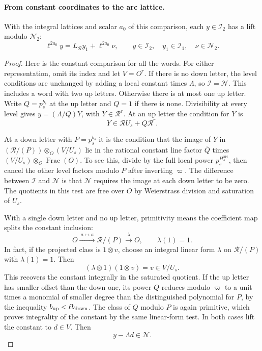 \paragraph{From constant coordinates to the arc lattice.}
\begin{lemma}\label{lem:wach-constant-lift}
With the integral lattices and scalar \(a_0\) of this comparison,
each \(y\in\mathcal I_2\) has a lift modulo \(\mathcal N_2\):
\begin{equation}\label{eq:wach-const-coord-lift}
 \ell^{2a_0}y=L_{\mathcal R}y_1+\ell^{2a_0}\nu,\qquad
 y\in\mathcal I_2,\quad y_1\in\mathcal I_1,\quad
 \nu\in\mathcal N_2 .
\end{equation}
\end{lemma}
\begin{proof}
Here is the constant comparison for all the words. For either
representation, omit its index and let \(V=O^r\). If there is
no down letter, the level conditions are unchanged by adding a
local constant times \(\Lambda\), so \(\mathcal I=\mathcal N\).
This includes a word with two up letters. Otherwise there is at
most one up letter. Write \(Q=p_s^{b_s}\) at the up letter and
\(Q=1\) if there is none. Divisibility at every level gives
\(y=(\Lambda/Q)Y\), with \(Y\in\mathcal R^r\).
At an up letter the condition for \(Y\) is
\[
             Y\in\mathcal R U_s+Q\mathcal R^r .
\]

At a down letter with \(P=p_s^{b_s}\) it is the condition that
the image of \(Y\) in \((\mathcal R/(P))\otimes_O(V/U_s)\)
lie in the rational constant line factor \(\overline Q\) times
\((V/U_s)\otimes_O\operatorname{Frac}(O)\). To see this,
divide by the full local power \(p_s^{H_s^{\mathrm{arc}}}\), then cancel the
other level factors modulo \(P\) after inverting \(\varpi\).
The difference between \(\mathcal I\) and \(\mathcal N\) is
that \(\mathcal N\) requires the image at each down letter to
be zero. The quotients in this test are free over \(O\) by
Weierstrass division and saturation of \(U_s\).

With a single down letter and no up letter, primitivity means the coefficient map splits the constant inclusion:
\[
 O\xrightarrow{\ a\mapsto a\ }\mathcal R/(P)\xrightarrow{\lambda}O,\qquad \lambda(1)=1.
\]
In fact, if the projected class is \(1\otimes v\), choose an integral
linear form \(\lambda\) on \(\mathcal R/(P)\) with \(\lambda(1)=1\).
Then
\[
 (\lambda\otimes1)(1\otimes v)=v\in V/U_s .
\]
This recovers the constant integrally in the saturated quotient. If the up letter
has smaller offset than the down one, its power \(Q\) reduces
modulo \(\varpi\) to a unit times a monomial of smaller degree
than the distinguished polynomial for \(P\), by the inequality
\(b_{\rm up}<\ell b_{\rm down}\). The class of \(Q\) modulo
\(P\) is again primitive, which proves integrality of the
constant by the same linear-form test. In both cases lift the
constant to \(d\in V\). Then
\[
 y-\Lambda d\in\mathcal N.
\]



\end{proof}
